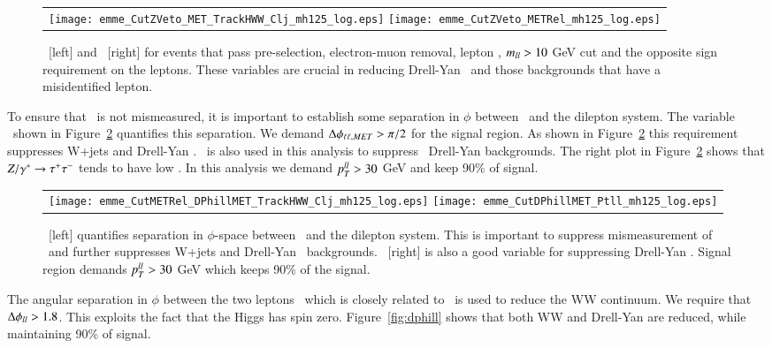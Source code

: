 \begin{figure}[!h]
\centering
\begin{tabular}{c}
	\texttt{[image: emme\_CutZVeto\_MET\_TrackHWW\_Clj\_mh125\_log.eps]}
	\texttt{[image: emme\_CutZVeto\_METRel\_mh125\_log.eps]}\\
\end{tabular}
\caption{\met\ [left] and \metRel\ [right] for events that pass pre-selection, electron-muon removal, lepton \pt,
$m_{ll}>10$ GeV cut and the opposite sign requirement on the leptons. These variables are crucial in reducing 
Drell-Yan \tautau\ and those backgrounds that have a misidentified lepton.}
\label{fig:met}
\end{figure}

\par To ensure that \met\ is not mismeasured, it is important to establish some separation in $\phi$ 
between \met\ and the dilepton system. The variable \dphillmet\ shown in Figure~\ref{fig:dphillmet}
quantifies this separation. We demand $\dphillmet>\pi/2$ for the signal region. As shown in Figure~\ref{fig:dphillmet} 
this requirement suppresses W+jets and Drell-Yan \tautau. \ptll\ is also used in this analysis to suppress
\tautau\ Drell-Yan backgrounds. The right plot in Figure~\ref{fig:dphillmet} shows that $Z/\gamma^*\rightarrow\mathrm{\tau^+ \tau^-}$ tends to 
have low \pt. In this analysis we demand $p_{T}^{ll}>30$ GeV and keep 90\% of signal. 

\begin{figure}[!h]
\centering
\begin{tabular}{c}
	\texttt{[image: emme\_CutMETRel\_DPhillMET\_TrackHWW\_Clj\_mh125\_log.eps]}
	\texttt{[image: emme\_CutDPhillMET\_Ptll\_mh125\_log.eps]}\\
\end{tabular}
\caption{\dphillmet\ [left] quantifies separation in $\phi$-space between \met\ and the dilepton system. This 
is important to suppress mismeasurement of \met\ and further suppresses W+jets and Drell-Yan \tautau\ backgrounds.
\ptll\ [right] is also a good variable for suppressing Drell-Yan \tautau. Signal region demands $p_{T}^{ll}>30$ GeV which keeps 
90\% of the signal.}
\label{fig:dphillmet}
\end{figure}

\par The angular separation in $\phi$ between the two leptons \dfll\ which is closely related to \mll\ 
is used to reduce the WW continuum. We require that $\Delta\phi_{ll}>1.8$. This exploits the fact that the 
Higgs has spin zero. Figure~\ref{fig:dphill} shows that both WW and Drell-Yan are reduced, while maintaining 
90\% of signal. 


